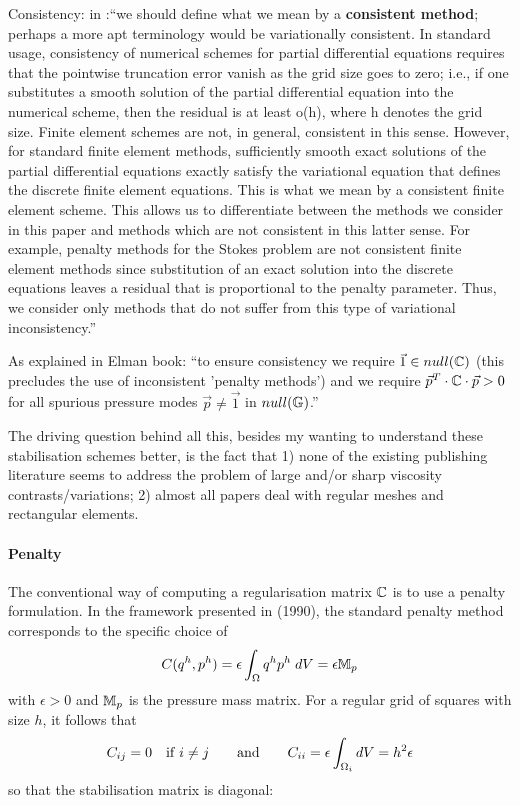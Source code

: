 Consistency: in \textcite{babg04}:``we should define what we mean by a \textbf{consistent method}; perhaps
a more apt terminology would be variationally consistent. In standard usage, consistency of numerical schemes for partial differential equations requires that the pointwise
truncation error vanish as the grid size goes to zero; i.e., if one substitutes a smooth
solution of the partial differential equation into the numerical scheme, then the residual is at least o(h), where h denotes the grid size. Finite element schemes are not,
in general, consistent in this sense. However, for standard finite element methods,
sufficiently smooth exact solutions of the partial differential equations exactly satisfy
the variational equation that defines the discrete finite element equations. This is
what we mean by a consistent finite element scheme. This allows us to differentiate
between the methods we consider in this paper and methods which are not consistent
in this latter sense. For example, penalty methods for the Stokes problem are not consistent finite element methods since substitution of an exact solution into the discrete
equations leaves a residual that is proportional to the penalty parameter. Thus, we
consider only methods that do not suffer from this type of variational inconsistency.''

As explained in Elman book: ``to ensure consistency we require $\vec{1} \in null({\mathbb{C}})$ (this precludes the use of inconsistent 'penalty methods') and we require $\vec{p}^T\cdot {\mathbb{C}} \cdot \vec{p} >0$ for all 
spurious pressure  modes $\vec{p} \neq \vec{1}$ in $null({\mathbb{G}})$.''


The driving question behind all this, besides my wanting to understand these stabilisation schemes better, is the fact that 1) none of the existing publishing literature seems to address the problem of large and/or sharp viscosity contrasts/variations; 2) almost all papers deal with regular meshes and rectangular elements.

\vspace{.5cm}

\paragraph{Penalty}

The conventional way of computing a regularisation matrix ${\mathbb{C}}$
is to use a penalty formulation.
In the framework presented in \textcite{sike90} (1990), the standard penalty method corresponds to the specific choice of
\begin{equation}
C(q^h,p^h)=\epsilon \int_\Omega q^h p^h \; dV = \epsilon {{\mathbb{M}}}_p
\end{equation}
with $\epsilon > 0$ and ${{\mathbb{M}}}_p$ is the pressure mass matrix. 
For a regular grid of squares with size $h$, it follows that 
\[
C_{ij}=0 \quad {\rm if} \; i\neq j
\quad\quad \text{and} \quad\quad
C_{ii}=\epsilon \int_{\Omega_i} dV = h^2 \epsilon
\]
so that the stabilisation matrix is diagonal:

